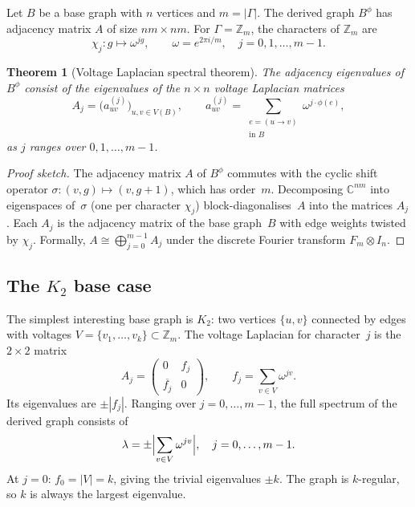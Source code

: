 \documentclass[11pt,a4paper]{article}
\theoremstyle{plain}
\newtheorem{theorem}{Theorem}
\theoremstyle{definition}
\theoremstyle{remark}
\newcommand{\Z}{\mathbb{Z}}
\newcommand{\C}{\mathbb{C}}
\begin{document}
Let $B$ be a base graph with $n$ vertices and $m = |\Gamma|$. The derived
graph $B^\phi$ has adjacency matrix $A$ of size $nm \times nm$. For
$\Gamma = \Z_m$, the characters of $\Z_m$ are
\[
  \chi_j \colon g \mapsto \omega^{jg}, \qquad \omega = e^{2\pi i/m},
  \quad j = 0, 1, \ldots, m-1.
\]

\begin{theorem}[Voltage Laplacian spectral theorem]
\label{thm:voltage-spec}
The adjacency eigenvalues of $B^\phi$ consist of the eigenvalues of the $n \times n$
\emph{voltage Laplacian matrices}
\[
  A_j = \bigl(a_{uv}^{(j)}\bigr)_{u,v \in V(B)}, \qquad
  a_{uv}^{(j)} = \sum_{\substack{e = (u \to v) \\ \text{in } B}} \omega^{j \cdot \phi(e)},
\]
as $j$ ranges over $0, 1, \ldots, m-1$.
\end{theorem}

\begin{proof}[Proof sketch]
The adjacency matrix $A$ of $B^\phi$ commutes with the cyclic shift operator
$\sigma: (v,g) \mapsto (v, g+1)$, which has order~$m$. Decomposing
$\C^{nm}$ into eigenspaces of~$\sigma$ (one per character $\chi_j$) block-diagonalises~$A$ into
the matrices $A_j$. Each $A_j$ is the adjacency matrix of the base
graph~$B$ with edge weights twisted by $\chi_j$. Formally,
$A \cong \bigoplus_{j=0}^{m-1} A_j$ under the discrete Fourier transform
$F_m \otimes I_n$.
\end{proof}

\subsection{The $K_2$ base case}

The simplest interesting base graph is $K_2$: two vertices $\{u, v\}$
connected by edges with voltages $V = \{v_1, \ldots, v_k\} \subset \Z_m$.
The voltage Laplacian for character~$j$ is the $2 \times 2$ matrix
\[
  A_j = \begin{pmatrix} 0 & f_j \\ \overline{f_j} & 0 \end{pmatrix},
  \qquad f_j = \sum_{v \in V} \omega^{jv}.
\]
Its eigenvalues are $\pm |f_j|$. Ranging over $j = 0, \ldots, m-1$, the full
spectrum of the derived graph consists of
\[
  \lambda = \pm \Bigl|\sum_{v \in V} \omega^{jv}\Bigr|, \quad j = 0, \ldots, m-1.
\]
At $j = 0$: $f_0 = |V| = k$, giving the trivial eigenvalues $\pm k$.
The graph is $k$-regular, so $k$ is always the largest eigenvalue.


\end{document}
